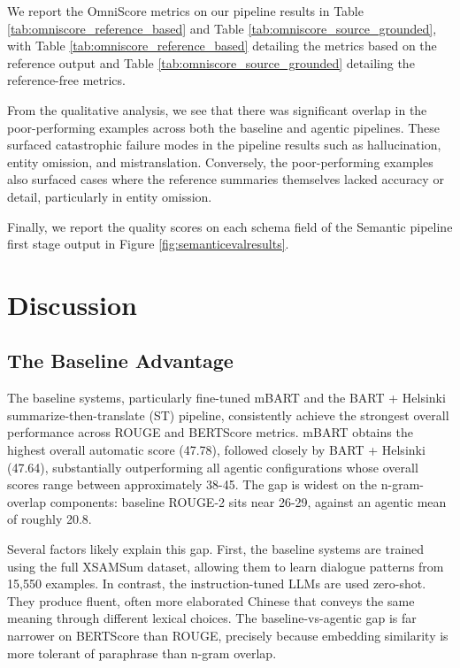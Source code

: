 \documentclass[11pt]{article}
\begin{document}
We report the OmniScore metrics on our pipeline results in Table \ref{tab:omniscore_reference_based} and Table \ref{tab:omniscore_source_grounded}, with Table \ref{tab:omniscore_reference_based} detailing the metrics based on the reference output and Table \ref{tab:omniscore_source_grounded} detailing the reference-free metrics.

From the qualitative analysis, we see that there was significant overlap in the poor-performing examples across both the baseline and agentic pipelines. These surfaced catastrophic failure modes in the pipeline results such as hallucination, entity omission, and mistranslation. Conversely, the poor-performing examples also surfaced cases where the reference summaries themselves lacked accuracy or detail, particularly in entity omission.

Finally, we report the quality scores on each schema field of the Semantic pipeline first stage output in Figure \ref{fig:semanticevalresults}.

\section{Discussion}

\subsection{The Baseline Advantage}
 The baseline systems, particularly fine-tuned mBART and the BART + Helsinki summarize-then-translate (ST) pipeline, consistently achieve the strongest overall performance across ROUGE and BERTScore metrics. mBART obtains the highest overall automatic score (47.78), followed closely by BART + Helsinki (47.64), substantially outperforming all agentic configurations whose overall scores range between approximately 38-45. The gap is widest on the n-gram-overlap components: baseline ROUGE-2 sits near 26-29, against an agentic mean of roughly 20.8.

 Several factors likely explain this gap. First, the baseline systems are trained using the full XSAMSum dataset, allowing them to learn dialogue patterns from 15{,}550 examples. In contrast, the instruction-tuned LLMs are used zero-shot. They produce fluent, often more elaborated Chinese that conveys the same meaning through different lexical choices. The baseline-vs-agentic gap is far narrower on BERTScore than ROUGE, precisely because embedding similarity is more tolerant of paraphrase than n-gram overlap.
\end{document}
